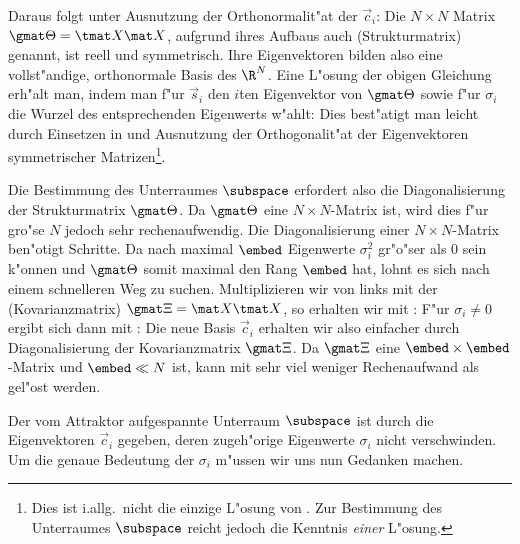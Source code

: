  Daraus folgt unter Ausnutzung der Orthonormalit"at der $\vec c_i$:
Die $N\times N$ Matrix $\gmat \Theta = \tmat X \mat X$, aufgrund ihres Aufbaus auch
\begriff(Strukturmatrix) genannt, ist reell und symmetrisch. Ihre
Eigenvektoren bilden also eine vollst"andige, orthonormale Basis des $\R^N$. 
Eine L"osung der obigen Gleichung erh"alt man, indem man f"ur $\vec s_i$ 
den $i$ten Eigenvektor von $\gmat \Theta$ sowie f"ur $\sigma_i$ die Wurzel des entsprechenden Eigenwerts w"ahlt:
Dies best"atigt man leicht durch Einsetzen in  und Ausnutzung der Orthogonalit"at der
Eigenvektoren symmetrischer Matrizen\footnote{Dies ist i.allg.\  nicht die einzige L"osung 
  von . Zur Bestimmung des Unterraumes $\subspace$ reicht jedoch die
  Kenntnis {\em einer} L"osung. }. 

Die Bestimmung des Unterraumes $\subspace$ erfordert also die
Diagonalisierung der Strukturmatrix $\gmat \Theta$. Da $\gmat \Theta$
eine $N\times N$-Matrix ist, wird dies f"ur gro"se $N$ jedoch
sehr rechenaufwendig. Die Diagonalisierung einer $N\times N$-Matrix ben"otigt 
Schritte. 
 Da nach  maximal $\embed$ Eigenwerte
$\sigma_i^2$ gr"o"ser als 0 sein k"onnen und $\gmat \Theta$ somit maximal den Rang
$\embed$ hat, lohnt es sich nach einem schnelleren Weg zu suchen. 
Multiplizieren wir  von links mit der
\begriff(Kovarianzmatrix) $\gmat \Xi = \mat X \tmat X$, so erhalten wir mit :
F"ur $\sigma_i\neq 0$ ergibt sich dann mit :
Die neue Basis $\vec c_i$ erhalten wir  
also einfacher durch Diagonalisierung der Kovarianzmatrix $\gmat \Xi$. Da $\gmat \Xi$ eine
$\embed\times\embed$-Matrix und $\embed\ll N$ ist, kann  mit sehr viel
weniger Rechenaufwand als  gel"ost werden.

Der vom Attraktor aufgespannte Unterraum $\subspace$ ist durch die Eigenvektoren $\vec
c_i$ gegeben, deren zugeh"orige Eigenwerte $\sigma_i$ nicht verschwinden. Um die genaue
Bedeutung der $\sigma_i$ m"ussen wir uns nun Gedanken machen.


